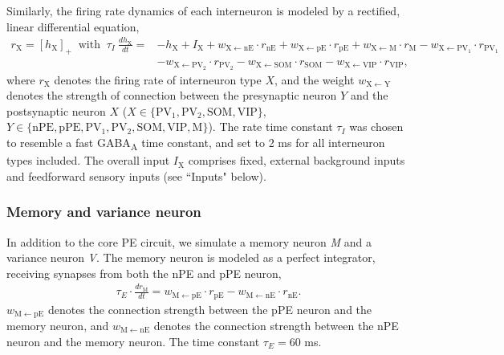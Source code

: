 \documentclass[10pt,a4paper]{article}
\begin{document}
Similarly, the firing rate dynamics of each interneuron is modeled by a rectified, linear differential equation,
%
\begin{align}
\label{eq:RateEqINs}
r_\mathrm{X} = [h_\mathrm{X}]_+ \ \mbox{ with }\ \tau_I\ \frac{dh_\mathrm{X}}{dt} =& -h_\mathrm{X} + I_{\mathrm{X}} + w_\mathrm{X\leftarrow nE}\cdot r_\mathrm{nE} + w_\mathrm{X\leftarrow pE}\cdot r_\mathrm{pE}  +  w_\mathrm{X\leftarrow M}\cdot  r_\mathrm{M} - w_\mathrm{X\leftarrow PV_1}\cdot r_\mathrm{PV_1}  \nonumber\\
&- w_\mathrm{X\leftarrow PV_2}\cdot r_\mathrm{PV_2}  - w_\mathrm{X\leftarrow SOM}\cdot r_\mathrm{SOM} -  w_\mathrm{X\leftarrow VIP}\cdot r_\mathrm{VIP},
\end{align}
%
where $r_\mathrm{X}$ denotes the firing rate of interneuron type $X$, and the weight $w_\mathrm{X\leftarrow Y}$ denotes the strength of connection between the presynaptic neuron $Y$ and the postsynaptic neuron $X$ ($X \in \lbrace \mathrm{PV_1}, \mathrm{PV_2}, \mathrm{SOM}, \mathrm{VIP}\rbrace$, $Y\in \lbrace \mathrm{nPE}, \mathrm{pPE}, \mathrm{PV_1}, \mathrm{PV_2}, \mathrm{SOM}, \mathrm{VIP}, \mathrm{M}\rbrace$). The rate time constant $\tau_I$ was chosen to resemble a fast GABA\textsubscript{A} time constant, and set to 2 ms for all interneuron types included. The overall input $I_\mathrm{X}$ comprises fixed, external background inputs and feedforward sensory inputs (see ``Inputs" below).

\subsubsection{Memory and variance neuron}
%
In addition to the core PE circuit, we simulate a memory neuron \textit{M} and a variance neuron \textit{V}. The memory neuron is modeled as a perfect integrator, receiving synapses from both the nPE and pPE neuron,
%
\begin{align}
\tau_E \cdot \frac{dr_\mathrm{M}}{dt} = w_\mathrm{M\leftarrow pE} \cdot r_\mathrm{pE} - w_\mathrm{M\leftarrow nE} \cdot r_\mathrm{nE}.
\end{align}
%
$w_\mathrm{M\leftarrow pE}$ denotes the connection strength between the pPE neuron and the memory neuron, and  $w_\mathrm{M\leftarrow nE}$ denotes the connection strength between the nPE neuron and the memory neuron. The time constant $\tau_E = 60$ ms.
\end{document}
